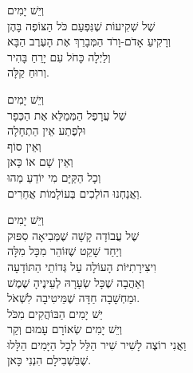 \documentclass{article}
\begin{document}
\begin{hebrew}
        וְיֵשׁ יָמִים \\
        שֶׁל שְׁקִיעוֹת שֶׁנִּפְעַם כֹּל הַצּוֹפֶה בָּהֶן \\
        וְרָקִיעַ אָדֹם-וָרֹד הַמְּבָרֵךְ אֶת הָעֶרֶב הַבָּא \\
        וְלַיְלָה כָּחֹל עִם יָרֵחַ בָּהִיר \\
        וְרוּחַ קַלָּה.

        וְיֵשׁ יָמִים \\
        שֶׁל עֲרָפֶל הַמְּמַלֵּא אֶת הַכְּפָר \\
        וּלְפֶתַע אֵין הַתְחָלָה \\
        וְאֵין סוֹף \\
        וְאֵין שָׁם אוֹ כָּאן \\
        וְכָל הַקַּיָּם מִי יוֹדֵעַ מַהוּ \\
        וַאֲנַחְנוּ הוֹלְכִים בְּעוֹלָמוֹת אֲחֵרִים.

        וְיֵשׁ יָמִים \\
        שֶׁל עֲבוֹדָה קָשָׁה שֶׁמְּבִיאָה סִפּוּק \\
        וְיַחַד שָׁקֵט שֶׁזּוֹהֵר מִכָּל מִלָּה \\
        וִיצִירָתִיּוֹת הָעוֹלָה עַל גְּדוֹתֵי הַתּוֹדָעָה \\
        וְאַהֲבָה שֶׁכָּל שְׂעָרָהּ לְעֵינֶיהָ שֶׁמֶשׁ \\
        וּמַחְשָׁבָה חַדָּה שֶׁמֵּיטִיבָה לִשְׁאֹל. \\


        יֵשׁ יָמִים הַבּוֹהֲקִים מִכֹּל \\
        וְיֵשׁ יָמִים שְׂאוֹרָם עָמוּם וְקַר \\
        וַאֲנִי רוֹצֶה לָשִׁיר שִׁיר הַלֵּל לְכָל הַיָּמִים הַלָּלוּ \\
        שֶׁבִּשְׁבִילָם הִנְנִי כָּאן.
    \end{hebrew}
\end{document}
